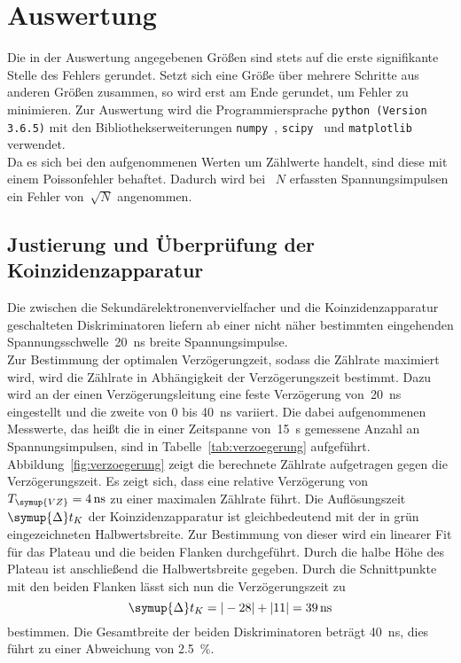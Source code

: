 \section{Auswertung}
\label{sec:auswertung}
Die in der Auswertung angegebenen Größen sind stets auf die erste signifikante
Stelle des Fehlers gerundet. Setzt sich eine Größe über mehrere Schritte aus
anderen Größen zusammen, so wird erst am Ende gerundet, um Fehler zu minimieren.
Zur Auswertung wird die Programmiersprache \texttt{python (Version 3.6.5)} mit
den Bibliothekserweiterungen \texttt{numpy}~\cite{numpy},
\texttt{scipy}~\cite{scipy} und \texttt{matplotlib}~\cite{matplotlib} verwendet.\\
\newline
Da es sich bei den aufgenommenen Werten um Zählwerte handelt, sind diese mit einem
Poissonfehler behaftet. Dadurch wird bei ~$N$ erfassten Spannungsimpulsen ein Fehler
von~$\sqrt{N}$ angenommen.

\subsection{Justierung und Überprüfung der Koinzidenzapparatur}
Die zwischen die Sekundärelektronenvervielfacher und die Koinzidenzapparatur
geschalteten Diskriminatoren liefern ab einer nicht näher bestimmten eingehenden
Spannungsschwelle~\SI{20}{\nano\second} breite Spannungsimpulse.\\
\newline
Zur Bestimmung der optimalen Verzögerungzeit, sodass die Zählrate maximiert wird,
wird die Zählrate in Abhängigkeit der Verzögerungszeit bestimmt. Dazu wird an der
einen Verzögerungsleitung eine feste Verzögerung von~\SI{20}{\nano\second} eingestellt
und die zweite von $0$ bis \SI{40}{\nano\second} variiert.
Die dabei aufgenommenen Messwerte, das heißt die in einer Zeitspanne von~\SI{15}{\second}
gemessene Anzahl an Spannungsimpulsen, sind in Tabelle~\ref{tab:verzoegerung} aufgeführt.
Abbildung~\ref{fig:verzoegerung} zeigt die berechnete Zählrate aufgetragen gegen
die Verzögerungszeit. Es zeigt sich, dass eine relative Verzögerung
von~$T_{\symup{VZ}}=\SI{4}{\nano\second}$ zu einer maximalen Zählrate führt.
Die Auflösungszeit~$\symup{\Delta}t_K$ der Koinzidenzapparatur ist gleichbedeutend
mit der in grün eingezeichneten Halbwertsbreite. Zur Bestimmung von dieser wird
ein linearer Fit für das Plateau und die beiden Flanken durchgeführt. Durch die halbe
Höhe des Plateau ist anschließend die Halbwertsbreite gegeben. Durch die Schnittpunkte
mit den beiden Flanken lässt sich nun die Verzögerungszeit zu
\begin{equation}
  \symup{\Delta}t_K = |-28| + |11| = \SI{39}{\nano\second}
\end{equation}
bestimmen.
Die Gesamtbreite der beiden Diskriminatoren beträgt \SI{40}{\nano\second}, dies
führt zu einer Abweichung von \SI{2.5}{\percent}.

